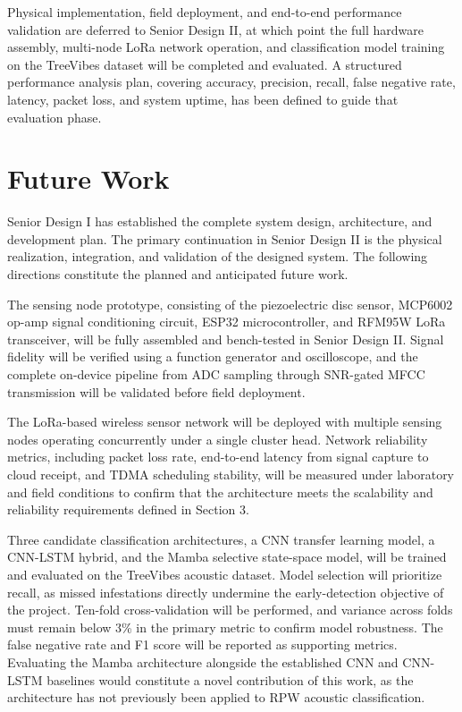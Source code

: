 \documentclass[12pt,a4paper,oneside]{memoir}
\begin{document}
Physical implementation, field deployment, and end-to-end performance validation are deferred to Senior Design II, at which point the full hardware assembly, multi-node LoRa network operation, and classification model training on the TreeVibes dataset will be completed and evaluated. A structured performance analysis plan, covering accuracy, precision, recall, false negative rate, latency, packet loss, and system uptime, has been defined to guide that evaluation phase.

\section{Future Work}
\label{sec:futurework}

Senior Design I has established the complete system design, architecture, and development plan. The primary continuation in Senior Design II is the physical realization, integration, and validation of the designed system. The following directions constitute the planned and anticipated future work.

The sensing node prototype, consisting of the piezoelectric disc sensor, MCP6002 op-amp signal conditioning circuit, ESP32 microcontroller, and RFM95W LoRa transceiver, will be fully assembled and bench-tested in Senior Design II. Signal fidelity will be verified using a function generator and oscilloscope, and the complete on-device pipeline from ADC sampling through SNR-gated MFCC transmission will be validated before field deployment.

The LoRa-based wireless sensor network will be deployed with multiple sensing nodes operating concurrently under a single cluster head. Network reliability metrics, including packet loss rate, end-to-end latency from signal capture to cloud receipt, and TDMA scheduling stability, will be measured under laboratory and field conditions to confirm that the architecture meets the scalability and reliability requirements defined in Section 3.

Three candidate classification architectures, a CNN transfer learning model, a CNN-LSTM hybrid, and the Mamba selective state-space model, will be trained and evaluated on the TreeVibes acoustic dataset. Model selection will prioritize recall, as missed infestations directly undermine the early-detection objective of the project. Ten-fold cross-validation will be performed, and variance across folds must remain below 3\% in the primary metric to confirm model robustness. The false negative rate and F1 score will be reported as supporting metrics. Evaluating the Mamba architecture alongside the established CNN and CNN-LSTM baselines would constitute a novel contribution of this work, as the architecture has not previously been applied to RPW acoustic classification.
\end{document}
